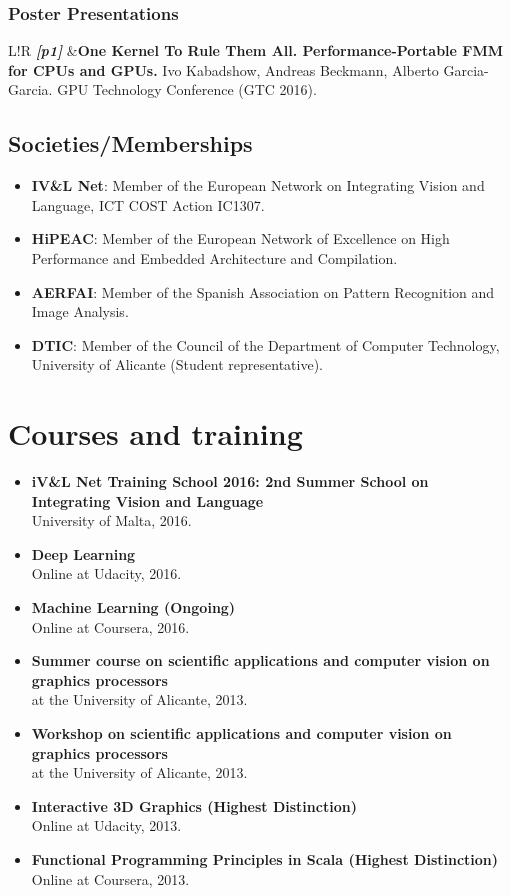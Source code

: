 \documentclass[8pt]{article}
\newcommand\VRule{\color{lightgray}\vrule width 0.5pt}
\begin{document}
\subsubsection*{Poster Presentations}

\begin{tabular}{L!{\VRule}R}
	\textit{\textbf{[p1]}} &\textbf{One Kernel To Rule Them All. Performance-Portable FMM for CPUs and GPUs.} Ivo Kabadshow, Andreas Beckmann, Alberto Garcia-Garcia. GPU Technology Conference (GTC 2016).\\
\end{tabular}

\subsection*{Societies/Memberships}

\begin{itemize}
	\item \textbf{IV\&L Net}: Member of the European Network on Integrating Vision and Language, ICT COST Action IC1307.
	\item \textbf{HiPEAC}: Member of the European Network of Excellence on High Performance and Embedded Architecture and Compilation.
	\item \textbf{AERFAI}: Member of the Spanish Association on Pattern Recognition and Image Analysis.
	\item \textbf{DTIC}: Member of the Council of the Department of Computer Technology, University of Alicante (Student representative).
\end{itemize}


\section*{Courses and training}

\begin{itemize}
	\item \textbf{iV\&L Net Training School 2016: 2nd Summer School on Integrating Vision and Language}\\ University of Malta, 2016.
	\item \textbf{Deep Learning}\\ Online at Udacity, 2016.
	\item \textbf{Machine Learning (Ongoing)}\\ Online at Coursera, 2016.
	\item \textbf{Summer course on scientific applications and computer vision on graphics processors}\\ at the University of Alicante, 2013.
	\item \textbf{Workshop on scientific applications and computer vision on graphics processors}\\ at the University of Alicante, 2013.	
	\item \textbf{Interactive 3D Graphics (Highest Distinction)}\\
	Online at Udacity, 2013.
	\item \textbf{Functional Programming Principles in Scala (Highest Distinction)}\\
	Online at Coursera, 2013.
\end{itemize}
\end{document}
